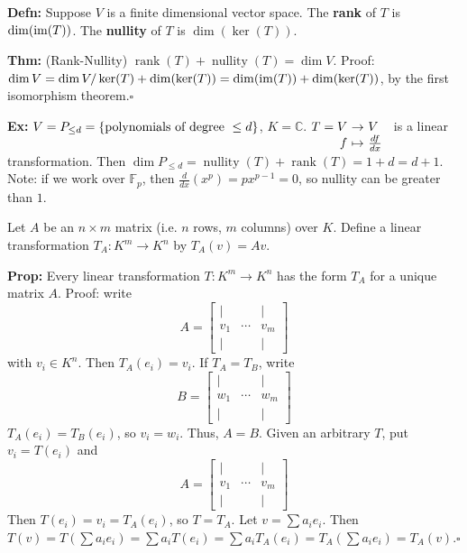 \documentclass[10pt,letterpaper]{article}
\newcommand{\n}{\hfill\break}
\newcommand{\hangblock}[2]{\par\noindent\settowidth{\hangindent}{\textbf{#1: }}\textbf{#1: }\!\!\!#2}
\newcommand{\defn}[1]{\hangblock{Defn}{#1}}
\newcommand{\thm}[1]{\hangblock{Thm}{#1}}
\newcommand{\prop}[1]{\hangblock{Prop}{#1}}
\newcommand{\ex}[1]{\hangblock{Ex}{#1}}
\newcommand{\proven}{\;$\square$\n}
\newcommand{\ptxt}[1]{\textrm{\textnormal{#1}}}
\newcommand{\set}[1]{\left\{#1\right\}}
\newcommand{\complex}{\mathbb{C}}
\newcommand{\C}{\complex}
\newcommand{\map}[4]{\!\!\!\begin{array}[t]{rcl}#1 & \!\!\!\!\to & \!\!\!\!#2\\ #3 & \!\!\!\!\mapsto & \!\!\!\!#4\end{array}}
\newcommand{\im}{\textrm{\textnormal{im}}}
\DeclareMathOperator{\rank}{rank}
\newcommand{\F}{\mathbb{F}}
\begin{document}
\defn{
	Suppose $V$ is a finite dimensional vector space. The \textbf{rank} of $T$ is $\dim(\im(T))$. The \textbf{nullity} of $T$ is $\dim(\ker(T))$.\n
}

\thm{
	(Rank-Nullity) $\rank(T)+\operatorname{nullity}(T)=\dim{}V$.\n
	Proof: $\dim{}V=\dim{}V/\ker(T)+\dim(\ker(T))=\dim(\im(T))+\dim(\ker(T))$, by the first isomorphism theorem.\proven
}

\ex{
	$V=P_{\le{}d}=\set{\ptxt{polynomials of degree }\le{}d}$, $K=\C$.\n
	$\map{T=V}{V}{f}{\frac{df}{dx}}$ is a linear transformation.\n
	Then $\dim{}P_{\le{}d}=\operatorname{nullity}(T)+\rank(T)=1+d=d+1$.\n
	Note: if we work over $\F_{p}$, then $\frac{d}{dx}(x^{p})=px^{p-1}=0$, so nullity can be greater than $1$.\n
}

\par\noindent
Let $A$ be an $n\times{}m$ matrix (i.e. $n$ rows, $m$ columns) over $K$. Define a linear transformation $T_{A}:K^{m}\to{}K^{n}$ by $T_{A}(v)=Av$.\n

\prop{
	Every linear transformation $T:K^{m}\to{}K^{n}$ has the form $T_{A}$ for a unique matrix $A$.\n
	Proof: write
	\[
		A=\begin{bmatrix}
			| & & |\\
			v_{1} & \cdots & v_{m}\\
			| & & |
		\end{bmatrix}
	\]
	with $v_{i}\in{}K^{n}$. Then $T_{A}(e_{i})=v_{i}$.\n
	If $T_{A}=T_{B}$, write
	\[
		B=\begin{bmatrix}
			| & & |\\
			w_{1} & \cdots & w_{m}\\
			| & & |
		\end{bmatrix}
	\]
	$T_{A}(e_{i})=T_{B}(e_{i})$, so $v_{i}=w_{i}$. Thus, $A=B$.\n
	\n
	Given an arbitrary $T$, put $v_{i}=T(e_{i})$ and
	\[
		A=\begin{bmatrix}
			| & & |\\
			v_{1} & \cdots & v_{m}\\
			| & & |
		\end{bmatrix}
	\]
	Then $T(e_{i})=v_{i}=T_{A}(e_{i})$, so $T=T_{A}$.\n
	Let $v=\sum{}a_{i}e_{i}$. Then $T(v)=T(\sum{}a_{i}e_{i})=\sum{}a_{i}T(e_{i})=\sum{}a_{i}T_{A}(e_{i})=T_{A}(\sum{}a_{i}e_{i})=T_{A}(v)$.\proven
}
\end{document}
